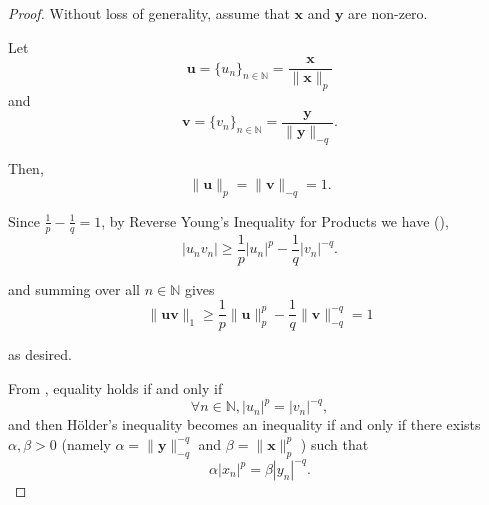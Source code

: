 \documentclass[10pt]{article} %
\def\rvx{{\mathbf{x}}}
\def\rvy{{\mathbf{y}}}
\begin{document}
\begin{proof}
Without loss of generality, assume that $ \rvx $ and $ \rvy $ are non-zero.

Let
\begin{equation}
\mathbf{u} = \{u_n\}_{n\in \mathbb{N}} = \frac{\rvx}{\|\rvx\|_p}
\end{equation}
and
\begin{equation}
\mathbf{v} = \{v_n\}_{n\in \mathbb{N}} = \frac{\rvy}{\|\rvy\|_{-q}}.
\end{equation}

Then,
\begin{equation}
\|\mathbf{u}\|_p = \|\mathbf{v}\|_{-q}  = 1.
\end{equation}

Since $\frac{1}{p} - \frac{1}{q} = 1$, by Reverse Young's Inequality for Products we have (),
\begin{equation}
|u_n v_n| \geq \frac{1}{p} |u_n|^p - \frac{1}{q} |v_n|^{-q}.
\end{equation}

and summing over all $ n \in \mathbb{N} $ gives
\begin{equation}
\|\mathbf{u}\mathbf{v}\|_1 \geq \frac{1}{p} \|\mathbf{u}\|^p_p - \frac{1}{q} \|\mathbf{v}\|^{-q}_{-q} = 1
\end{equation}

as desired.

From , equality holds if and only if
\begin{equation}
\forall n \in \mathbb{N}, |u_n|^p = |v_n|^{-q},
\end{equation}
and then Hölder's inequality becomes an inequality if and only if there exists $\alpha,\beta > 0$ (namely $\alpha = \|\rvy \|_{-q}^{-q}$ and $\beta = \|\rvx \|_{p}^p$ ) such that
\begin{equation}
\alpha | x_n |^p = \beta | y_n |^{-q}.
\end{equation}
\end{proof}
\end{document}
